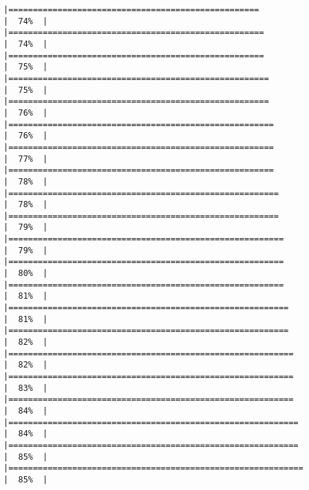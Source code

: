 \documentclass[10pt,letterpaper]{article}
\begin{document}
\begin{verbatim}
|===================================================                   |  74%  |                                                                              |====================================================                  |  74%  |                                                                              |====================================================                  |  75%  |                                                                              |=====================================================                 |  75%  |                                                                              |=====================================================                 |  76%  |                                                                              |======================================================                |  76%  |                                                                              |======================================================                |  77%  |                                                                              |======================================================                |  78%  |                                                                              |=======================================================               |  78%  |                                                                              |=======================================================               |  79%  |                                                                              |========================================================              |  79%  |                                                                              |========================================================              |  80%  |                                                                              |========================================================              |  81%  |                                                                              |=========================================================             |  81%  |                                                                              |=========================================================             |  82%  |                                                                              |==========================================================            |  82%  |                                                                              |==========================================================            |  83%  |                                                                              |==========================================================            |  84%  |                                                                              |===========================================================           |  84%  |                                                                              |===========================================================           |  85%  |                                                                              |============================================================          |  85%  |                                                                              
\end{verbatim}
\end{document}
